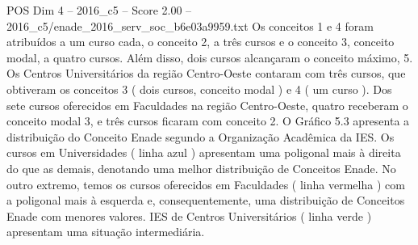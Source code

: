 \begin{textsample}{POS Dim 4 – 2016\_c5 – Score 2.00 – 2016\_c5/enade\_2016\_serv\_soc\_b6e03a9959.txt}
Os conceitos 1 e 4 foram atribuídos a um curso cada, o conceito 2, a três cursos e o conceito 3, conceito modal, a quatro cursos.
Além disso, dois cursos alcançaram o conceito máximo, 5.
Os Centros Universitários da região Centro-Oeste contaram com três cursos, que obtiveram os conceitos 3 ( dois cursos, conceito modal ) e 4 ( um curso ).
Dos sete cursos oferecidos em Faculdades na região Centro-Oeste, quatro receberam o conceito modal 3, e três cursos ficaram com conceito 2.
O Gráfico 5.3 apresenta a distribuição do Conceito Enade segundo a Organização Acadêmica da IES.
Os cursos em Universidades ( linha azul ) apresentam uma poligonal mais à direita do que as demais, denotando uma melhor distribuição de Conceitos Enade.
No outro extremo, temos os cursos oferecidos em Faculdades ( linha vermelha ) com a poligonal mais à esquerda e, consequentemente, uma distribuição de Conceitos Enade com menores valores.
IES de Centros Universitários ( linha verde ) apresentam uma situação intermediária.

\end{textsample}
